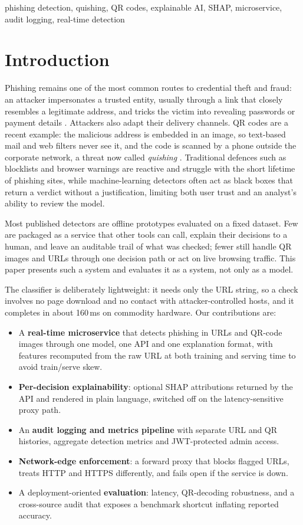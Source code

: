 \documentclass[conference]{IEEEtran}
\begin{document}
\begin{IEEEkeywords}
phishing detection, quishing, QR codes, explainable AI, SHAP, microservice, audit logging, real-time detection
\end{IEEEkeywords}

\section{Introduction}
Phishing remains one of the most common routes to credential theft and fraud: an attacker impersonates a trusted entity, usually through a link that closely resembles a legitimate address, and tricks the victim into revealing passwords or payment details \cite{zieni,li,kulkarni}. Attackers also adapt their delivery channels. QR codes are a recent example: the malicious address is embedded in an image, so text-based mail and web filters never see it, and the code is scanned by a phone outside the corporate network, a threat now called \emph{quishing} \cite{hwang,charan}. Traditional defences such as blocklists and browser warnings are reactive and struggle with the short lifetime of phishing sites, while machine-learning detectors often act as black boxes that return a verdict without a justification, limiting both user trust and an analyst's ability to review the model.

Most published detectors are offline prototypes evaluated on a fixed dataset. Few are packaged as a service that other tools can call, explain their decisions to a human, and leave an auditable trail of what was checked; fewer still handle QR images and URLs through one decision path or act on live browsing traffic. This paper presents such a system and evaluates it as a system, not only as a model.

The classifier is deliberately lightweight: it needs only the URL string, so a check involves no page download and no contact with attacker-controlled hosts, and it completes in about 160\,ms on commodity hardware. Our contributions are:
\begin{itemize}
\item A \textbf{real-time microservice} that detects phishing in URLs and QR-code images through one model, one API and one explanation format, with features recomputed from the raw URL at both training and serving time to avoid train/serve skew.
\item \textbf{Per-decision explainability}: optional SHAP attributions returned by the API and rendered in plain language, switched off on the latency-sensitive proxy path.
\item An \textbf{audit logging and metrics pipeline} with separate URL and QR histories, aggregate detection metrics and JWT-protected admin access.
\item \textbf{Network-edge enforcement}: a forward proxy that blocks flagged URLs, treats HTTP and HTTPS differently, and fails open if the service is down.
\item A deployment-oriented \textbf{evaluation}: latency, QR-decoding robustness, and a cross-source audit that exposes a benchmark shortcut inflating reported accuracy.
\end{itemize}
\end{document}
